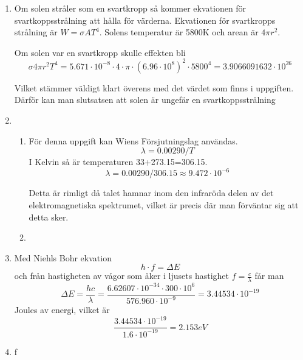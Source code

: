 \documentclass[a4paper,12pt]{article}
\begin{document}
\begin{enumerate}
      \item Om solen stråler som en svartkropp så kommer ekvationen för
            svartkoppsstrålning att hålla för värderna.
            Ekvationen för svartkropps strålning är $W=\sigma A T^4$.
            Solens temperatur är 5800K och arean är $4\pi r^2$.

            Om solen var en svartkropp skulle effekten bli
            $$\sigma 4\pi r^2T^4=5.671\cdot 10^{-8} \cdot 4 \cdot \pi \cdot (6.96\cdot 10^8)^2\cdot 5800^4=3.9066091632\cdot 10^{26}$$

            Vilket stämmer väldigt klart överens med det värdet som finns i uppgiften. Därför
            kan man slutsatsen att solen är ungefär en svartkoppsstrålning

      \item
            \begin{enumerate}
                  \item För denna uppgift kan Wiens Försjutningslag användas.
                        $$\lambda=0.00290/T$$
                        I Kelvin så är temperaturen 33+273.15=306.15.
                        $$\lambda=0.00290/306.15\approx 9.472\cdot 10^{-6}$$

                        Detta är rimligt då talet hamnar inom den infraröda delen
                        av det elektromagnetiska spektrumet, vilket är precis där
                        man förväntar sig att detta sker.

                  \item
            \end{enumerate}


      \item Med Niehls Bohr ekvation
            $$h\cdot f =\Delta E$$
            och från hastigheten av vågor som åker i ljusets hastighet
            $f=\frac{c}{\lambda}$ får man
            $$\Delta E=\frac{hc}{\lambda}=\frac{6.62607\cdot 10^{-34}\cdot 300\cdot 10^6}{576.960\cdot 10^{-9}}=3.44534\cdot 10^{-19}$$
            Joules av energi, vilket är
            $$\frac{3.44534\cdot 10^{-19}}{1.6\cdot 10^{-19}}=2.153 eV$$

      \item f
\end{enumerate}
\end{document}
